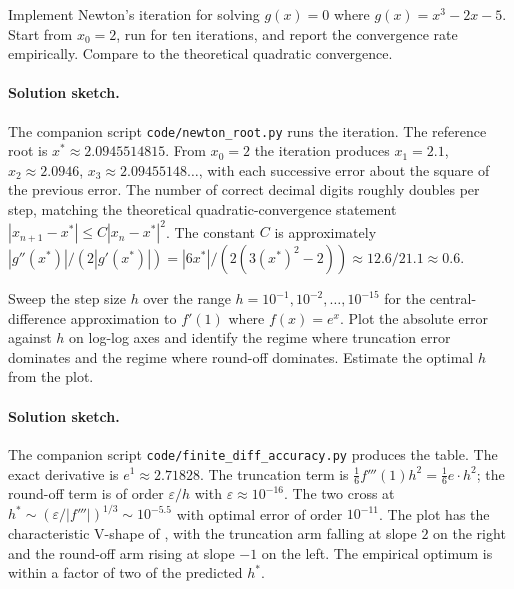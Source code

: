 \begin{exercise}
Implement Newton's iteration for solving $g(x) = 0$ where
$g(x) = x^{3} - 2 x - 5$. Start from $x_{0} = 2$, run for ten
iterations, and report the convergence rate empirically.
Compare to the theoretical quadratic convergence.
\end{exercise}

\paragraph{Solution sketch.}
The companion script \texttt{code/newton\_root.py} runs the
iteration. The reference root is $x^{*} \approx 2.0945514815$.
From $x_{0} = 2$ the iteration produces $x_{1} = 2.1$,
$x_{2} \approx 2.0946$, $x_{3} \approx 2.09455148\ldots$, with
each successive error about the square of the previous error.
The number of correct decimal digits roughly doubles per step,
matching the theoretical quadratic-convergence statement
$|x_{n+1} - x^{*}| \leq C |x_{n} - x^{*}|^{2}$. The constant $C$
is approximately $|g''(x^{*})| / (2 |g'(x^{*})|) =
|6 x^{*}|/(2(3 (x^{*})^{2} - 2)) \approx 12.6 / 21.1 \approx 0.6$.

\begin{exercise}
Sweep the step size $h$ over the range $h = 10^{-1}, 10^{-2},
\ldots, 10^{-15}$ for the central-difference approximation to
$f'(1)$ where $f(x) = e^{x}$. Plot the absolute error against $h$
on log-log axes and identify the regime where truncation error
dominates and the regime where round-off dominates. Estimate the
optimal $h$ from the plot.
\end{exercise}

\paragraph{Solution sketch.}
The companion script \texttt{code/finite\_diff\_accuracy.py}
produces the table. The exact derivative is $e^{1} \approx 2.71828$.
The truncation term is $\tfrac{1}{6} f'''(1) h^{2} = \tfrac{1}{6}
e \cdot h^{2}$; the round-off term is of order $\varepsilon / h$
with $\varepsilon \approx 10^{-16}$. The two cross at $h^{*} \sim
(\varepsilon / |f'''|)^{1/3} \sim 10^{-5.5}$ with optimal error of
order $10^{-11}$. The plot has the characteristic V-shape of
, with the truncation arm
falling at slope $2$ on the right and the round-off arm rising
at slope $-1$ on the left. The empirical optimum is within a
factor of two of the predicted $h^{*}$.


